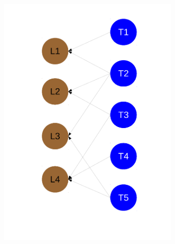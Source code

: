 \documentclass[12pt,letterpaper]{article}
\begin{document}
\begin{figure}[ht]
  \centering
  \begin{subfigure}[b]{0.4\textwidth}
    \caption{}
    \includegraphics[height = 0.5\textheight, width = \textwidth, keepaspectratio = true]{figure/bipartite_graph}
    \label{subfig:bip_net}
  \end{subfigure}


\end{figure}
\end{document}
